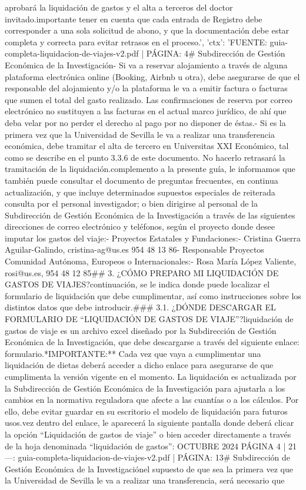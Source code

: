 \documentclass{article}
\begin{document}
\begin{itemize}
{{aprobará la liquidación de gastos y el alta a terceros del doctor invitado.\n\nEs importante tener en cuenta que cada entrada de Registro debe corresponder a una sola solicitud de abono, y que la documentación debe estar completa y correcta para evitar retrasos en el proceso.', 'ctx': 'FUENTE: guia-completa-liquidacion-de-viajes-v2.pdf | PÁGINA: 4\n# Subdirección de Gestión Económica de la Investigación\n\n- Si va a reservar alojamiento a través de alguna plataforma electrónica online (Booking, Airbnb u otra), debe asegurarse de que el responsable del alojamiento y/o la plataforma le va a emitir factura o facturas que sumen el total del gasto realizado. Las confirmaciones de reserva por correo electrónico no sustituyen a las facturas en el actual marco jurídico, de ahí que deba velar por no perder el derecho al pago por no disponer de éstas.\n\n- Si es la primera vez que la Universidad de Sevilla le va a realizar una transferencia económica, debe tramitar el alta de tercero en Universitas XXI Económico, tal como se describe en el punto 3.3.6 de este documento. No hacerlo retrasará la tramitación de la liquidación.\n\nComo complemento a la presente guía, le informamos que también puede consultar el documento de preguntas frecuentes, en continua actualización, y que incluye determinados supuestos especiales de reiterada consulta por el personal investigador; o bien dirigirse al personal de la Subdirección de Gestión Económica de la Investigación a través de las siguientes direcciones de correo electrónico y teléfonos, según el proyecto donde desee imputar los gastos del viaje:\n\n- Proyectos Estatales y Fundaciones:\n- Cristina Guerra Aguilar-Galindo, cristina-ag@us.es 954 48 13 86\n- Responsable Proyectos Comunidad Autónoma, Europeos o Internacionales:\n- Rosa María López Valiente, rosi@us.es, 954 48 12 85\n\n## 3. ¿CÓMO PREPARO MI LIQUIDACIÓN DE GASTOS DE VIAJES?\n\nA continuación, se le indica donde puede localizar el formulario de liquidación que debe cumplimentar, así como instrucciones sobre los distintos datos que debe introducir.\n\n### 3.1. ¿DÓNDE DESCARGAR EL FORMULARIO DE “LIQUIDACIÓN DE GASTOS DE VIAJE”?\n\nLa liquidación de gastos de viaje es un archivo excel diseñado por la Subdirección de Gestión Económica de la Investigación, que debe descargarse a través del siguiente enlace: formulario.\n\n**IMPORTANTE:** Cada vez que vaya a cumplimentar una liquidación de dietas deberá acceder a dicho enlace para asegurarse de que cumplimenta la versión vigente en el momento. La liquidación es actualizada por la Subdirección de Gestión Económica de la Investigación para ajustarla a los cambios en la normativa reguladora que afecte a las cuantías o a los cálculos. Por ello, debe evitar guardar en su escritorio el modelo de liquidación para futuros usos.\n\nUna vez dentro del enlace, le aparecerá la siguiente pantalla donde deberá clicar la opción “Liquidación de gastos de viaje” o bien acceder directamente a través de la hoja denominada “liquidación de gastos”:\n{} OCTUBRE 2024    PÁGINA 4 | 21\n\n---\n\nFUENTE: guia-completa-liquidacion-de-viajes-v2.pdf | PÁGINA: 13\n# Subdirección de Gestión Económica de la Investigación\n\nEn el supuesto de que sea la primera vez que la Universidad de Sevilla le va a realizar una transferencia, será necesario que }}
\end{itemize}
\end{document}
